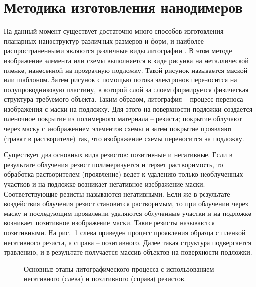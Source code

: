 \section{Методика изготовления нанодимеров}

На данный момент существует достаточно много способов изготовления планарных наноструктур различных размеров и форм, и наиболее распространенными являются различные виды литографии \cite{nanotechnologybook}. В этом методе изображение элемента или схемы выполняется в виде рисунка на металлической пленке, нанесенной на прозрачную подложку. Такой рисунок называется маской или шаблоном. Затем рисунок с помощью потока электронов переносится на полупроводниковую пластину, в которой слой за слоем формируется физическая структура требуемого объекта. Таким образом, литография -- процесс переноса изображения с маски на подложку. Для этого на поверхности подложки создается пленочное покрытие из полимерного материала -- резиста; покрытие облучают через маску с изображением элементов схемы и затем покрытие проявляют (травят в растворителе) так, что изображение схемы переносится на подложку.

Существует два основных вида резистов: позитивные и негативные. Если в результате облучения резист полимеризуется и теряет растворимость, то обработка растворителем (проявление) ведет к удалению только необлученных участков и на подложке возникает негативное изображение маски. Соответствующие резисты называются негативными. Если же в результате воздействия облучения резист становится растворимым, то при облучении через маску и последующим проявлении удаляются облученные участки и на подложке возникает позитивное изображение маски. Такие резисты называются позитивными. На рис.~\ref{img:litography} слева приведен процесс проявления образца с пленкой негативного резиста, а справа -- позитивного. Далее такая структура подвергается травлению, и в результате получается массив объектов на поверхности подложки.

\begin{figure}
\caption{Основные этапы литографического процесса с использованием негативного (слева) и позитивного (справа) резистов.}
\label{img:litography}
\end{figure}


